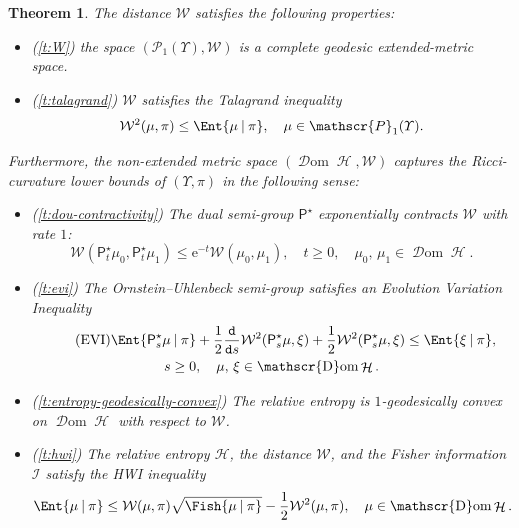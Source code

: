\documentclass[JEP,XML,SOM,Unicode,published]{cedram}
\newtheorem*{theorem*}{Theorem}
\theoremstyle{definition}
\theoremstyle{remark}
\newcommand{\given}[1][]{%
\nonscript\:#1\vert
\allowbreak
\nonscript\:
\mathopen{}}
\DeclareMathOperator{\ent}{\mathcal{H}}
\DeclareMathOperator{\dom}{\mathscr{D}om}
\begin{document}
\begin{theorem*}
The distance $\mathcal{W}$ satisfies the following properties:
\begin{itemize}[wide]
\item (\cref{t:W})
the space $(\mathscr{P}_{1}(\varUpsilon),\mathcal{W})$ is a complete geodesic extended-metric space.
\item (\cref{t:talagrand}) $\mathcal{W}$ satisfies the \emph{Talagrand inequality}
\begin{equation*}
\mathcal{W}^{2}(\mu, \pi) \leq \Ent{ \mu \given \pi}, \quad \mu \in \mathscr{P}_{1}(\varUpsilon).
\end{equation*}
\end{itemize}

Furthermore, the non-extended metric space $(\dom \ent, \mathcal{W})$ captures the Ricci-curvature lower bounds of $(\varUpsilon, \pi)$ in the following sense:
\begin{itemize}[wide]
\item (\cref{t:dou-contractivity})
The dual semi-group $\mathsf{P}^{\star}$ exponentially contracts $\mathcal{W}$ with rate $1$:
\begin{equation*}
\mathcal{W}(\mathsf{P}^{\star}_{t} \mu_{0}, \mathsf{P}^{\star}_{t} \mu_{1}) \leq \mathrm{e}^{-t} \mathcal{W}(\mu_{0}, \mu_{1}), \quad t \geq 0, \quad \mu_0,\, \mu_1 \in \dom \ent.
\end{equation*}

\item (\cref{t:evi}) The Ornstein--Uhlenbeck semi-group satisfies an \emph{Evolution Variation Inequality}
\begin{multline}\tag{EVI}\label{e:evi-intro}
\Ent{\mathsf{P}^{\star}_{s} \mu \given \pi} + \frac{1}{2} \frac{\mathtt{d}}{\mathtt{d} s} \mathcal{W}^{2}(\mathsf{P}^{\star}_{s} \mu, \xi) + \frac{1}{2} \mathcal{W}^{2}(\mathsf{P}^{\star}_{s} \mu, \xi) \leq \Ent{\xi \given \pi}, \\
s \geq 0, \quad \mu,\,\xi \in \dom \ent.
\end{multline}

\item (\cref{t:entropy-geodesically-convex})
The relative entropy is $1$-geodesically convex on $\dom \ent$ with respect to $\mathcal{W}$.

\item (\cref{t:hwi})
The relative entropy $\mathcal{H}$, the distance $\mathcal{W}$, and the Fisher information $\mathcal{I}$ satisfy the HWI inequality
\begin{equation*}
\Ent{ \mu \given \pi } \leq \mathcal{W}(\mu, \pi) \sqrt{\Fish{ \mu \given \pi }} - \frac{1}{2} \mathcal{W}^{2}(\mu, \pi), \quad \mu \in \dom \ent.
\end{equation*}
\end{itemize}
\end{theorem*}
\end{document}
